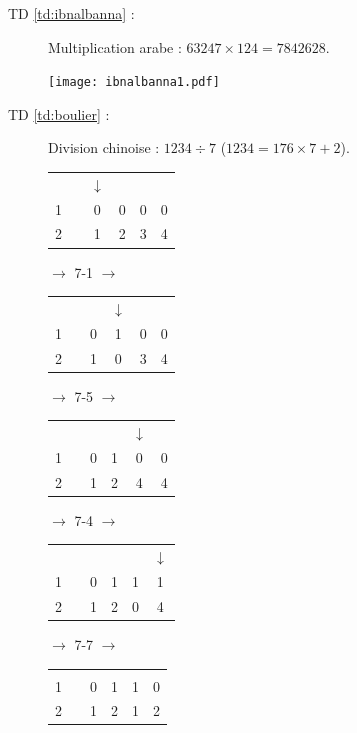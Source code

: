 \begin{description}
\item[TD \ref{td:ibnalbanna} :] Multiplication arabe : $63247\times124 = 7842628$.

	\vspace*{3mm}
	
	{\texttt{[image: ibnalbanna1.pdf]}} 

	
\item[TD \ref{td:boulier} :] Division chinoise : $1234 \div 7$ 
	($1234 = 176\times 7 +2$).
	
	\vspace*{3mm}
	
	{\footnotesize
	\begin{tabular}{|cccccc|}
	\hline
	  &                 & $\downarrow$ & & & \\
	1 & \makebox[1mm]{} & 0 & 0 & 0 & 0 \\
	\hline
	2 & & 1 & 2 & 3 & 4 \\
	\hline
	\end{tabular}
	$\rightarrow$ 7-1 $\rightarrow$ 
	\begin{tabular}{|cccccc|}
	\hline
	  &                 & & $\downarrow$ & & \\
	1 & \makebox[1mm]{} & 0 & 1 & 0 & 0 \\
	\hline
	2 & & 1 & 0 & 3 & 4\\
	\hline
	\end{tabular}
	$\rightarrow$ 7-5 $\rightarrow$ 
	\begin{tabular}{|cccccc|}
	\hline
	  &                 & & & $\downarrow$ & \\
	1 & \makebox[1mm]{} & 0 & 1 & 0 & 0 \\
	\hline
	2 & & 1 & 2 & 4 & 4\\
	\hline
	\end{tabular}
	$\rightarrow$ 7-4 $\rightarrow$ 
	\begin{tabular}{|cccccc|}
	\hline
	  &                 & & & & $\downarrow$ \\
	1 & \makebox[1mm]{} & 0 & 1 & 1 & 1 \\
	\hline
	2 & & 1 & 2 & 0 & 4\\
	\hline
	\end{tabular}
	$\rightarrow$ 7-7 $\rightarrow$ 
	\begin{tabular}{|cccccc|}
	\hline
	  &                 & & & & \\
	1 & \makebox[1mm]{} & 0 & 1 & 1 & 0 \\
	\hline
	2 & & 1 & 2 & 1 & 2\\
	\hline
	\end{tabular}
	}
	

\end{description}
